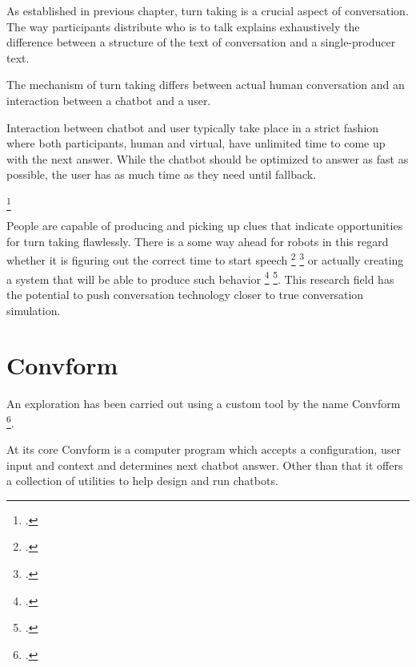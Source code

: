 \documentclass[12pt]{report}
\begin{document}
{\par
As established in previous chapter, turn taking is a crucial aspect of conversation.
The way participants distribute who is to talk
explains exhaustively
the difference between
a structure of the text of conversation
and a single-producer text.

The mechanism of turn taking differs
between actual human conversation
and an interaction between a chatbot and a user.

Interaction between chatbot and user
typically take place in a strict fashion
where both participants,
human and virtual,
have unlimited time to come up with the next answer.
While the chatbot should be optimized to answer as fast as possible,
the user has as much time as they need until fallback.

\par
{} \footcite{turntaking}

\par
People are capable of producing and picking up clues
that indicate opportunities for turn taking flawlessly.
There is a some way ahead for robots in this regard
whether it is figuring out the correct time to start speech \footcite{turntakingreview} \footcite{GRAVANO2011601}
or actually creating a system that will be able to produce such behavior \footcite{distributedturntaking} \footcite{Gervits2020Sigdial}.
This research field
has the potential to push conversation technology
closer to true conversation simulation.

\section{Convform}
\par
An exploration has been carried out using a custom tool by the name Convform \footcite{convform}.

At its core Convform is a computer program
which accepts a configuration, user input and context
and determines next chatbot answer.
Other than that it offers a collection of utilities
to help design and run chatbots.

}
\end{document}
